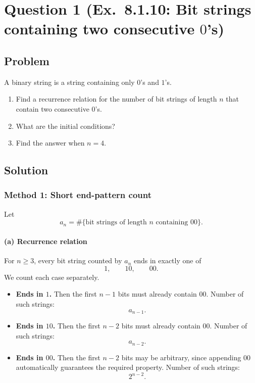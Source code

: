 \documentclass[12pt]{article}
\begin{document}
\section{Question 1 (Ex.\ 8.1.10: Bit strings containing two consecutive $0$'s)}

\subsection{Problem}
A binary string is a string containing only $0$'s and $1$'s.
\begin{enumerate}[label=(\alph*)]
\item Find a recurrence relation for the number of bit strings of length $n$ that contain two consecutive $0$'s.
\item What are the initial conditions?
\item Find the answer when $n=4$.
\end{enumerate}

\subsection{Solution}

\subsubsection*{Method 1: Short end-pattern count}

Let
\[
a_n=\#\{\text{bit strings of length }n\text{ containing }00\}.
\]

\paragraph{(a) Recurrence relation}
For \(n\ge 3\), every bit string counted by \(a_n\) ends in exactly one of
\[
1,\qquad 10,\qquad 00.
\]
We count each case separately.

\begin{itemize}[leftmargin=*]
  \item \textbf{Ends in \(1\).}  
  Then the first \(n-1\) bits must already contain \(00\).  
  Number of such strings:
  \[
  a_{n-1}.
  \]

  \item \textbf{Ends in \(10\).}  
  Then the first \(n-2\) bits must already contain \(00\).  
  Number of such strings:
  \[
  a_{n-2}.
  \]

  \item \textbf{Ends in \(00\).}  
  Then the first \(n-2\) bits may be arbitrary, since appending \(00\) automatically guarantees the required property.  
  Number of such strings:
  \[
  2^{n-2}.
  \]
\end{itemize}
\end{document}
